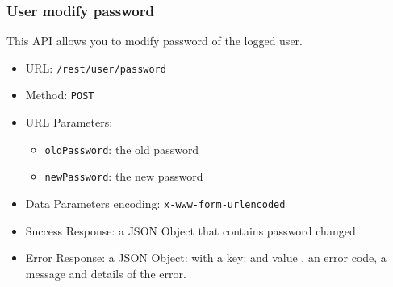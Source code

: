 \subsubsection*{User modify password}

This API allows you to modify password of the logged user.

\begin{itemize}
    \item URL: \texttt{/rest/user/password}
    \item Method: \texttt{POST}
    \item URL Parameters:
    \begin{itemize}
        \item \texttt{oldPassword}: the old password
        \item \texttt{newPassword}: the new password
    \end{itemize}
    \item Data Parameters encoding: \texttt{x-www-form-urlencoded}
    \item Success Response: a JSON Object that contains password changed
    \item Error Response: a JSON Object: with a key:   and value , an error code, a message and details of the error.
\end{itemize}